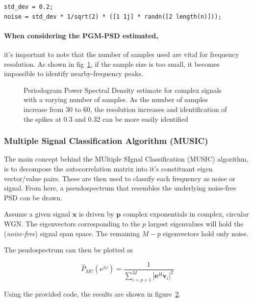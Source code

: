 \documentclass[main.tex]{subfiles}
\begin{document}
\begin{lstlisting}[frame=single]
std_dev = 0.2;
noise = std_dev * 1/sqrt(2) * ([1 1j] * randn([2 length(n)]));
\end{lstlisting}

\paragraph{When considering the PGM-PSD estimated, } it's important to note that the number of samples used are vital for frequency resolution. As shown in fig~\ref{fig:q2_1_d}, if the sample size is too small, it becomes impossible to identify nearby-frequency peaks. 

\begin{figure}[H]
	\centering 
	\resizebox{\textwidth}{!}{}
	\caption{Periodogram Power Spectral Density estimate for complex signals with a varying number of samples. As the number of samples increase from 30 to 60, the resolution increases and identification of the spikes at 0.3 and 0.32 can be more easily identified}
	\label{fig:q2_1_d}
\end{figure}


\subsubsection{Multiple Signal Classification Algorithm (MUSIC)}

The main concept behind the MUltiple SIgnal Classification (MUSIC) algorithm, is to decompose the autocorrelation matrix into it's constituant eigen vector/value pairs. These are then used to classify each frequency as noise or signal. From here, a pseudospectrum that resembles the underlying noise-free PSD can be drawn.

Assume a given signal $\textbf{x}$ is driven by $\textbf{p}$ complex exponentials in complex, circular WGN. The eigenvectors corresponding to the $p$ largest eigenvalues will hold the (\textit{noise-free}) signal span space. The remaining $M-p$ eigenvectors hold only noise. 

The psudospectrum can then be plotted as

\[
\hat P_{MU}(e^{j \omega}) = \frac{1}{\sum_{i=p+1}^{M} |\mathbf{e}^{H} \mathbf{v}_i|^2}
\]

Using the provided code, the results are shown in figure~\ref{fig:q2_1_e}.

\begin{figure}[H]
	\centering 
	\resizebox{\textwidth}{!}{}
	\caption{}
	\label{fig:q2_1_e}
\end{figure}
\end{document}
